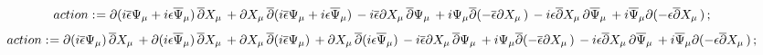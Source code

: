 \documentclass[11pt]{article}
\def\specialcolon{\mathrel{\mathop{:}}\hspace{-.5em}}
\renewcommand{\bar}[1]{\overline{#1}}
\begin{document}
\begin{dmath*}[compact, spread=2pt]
action\specialcolon{}= \partial{(i \bar{\epsilon} {\Psi}_{\mu} + i \epsilon {\bar{\Psi}}_{\mu})}\,  \bar{\partial}{{X}_{\mu}}\,  + \partial{{X}_{\mu}}\,  \bar{\partial}{(i \bar{\epsilon} {\Psi}_{\mu} + i \epsilon {\bar{\Psi}}_{\mu})}\,  - i \bar{\epsilon} \partial{{X}_{\mu}}\,  \bar{\partial}{{\Psi}_{\mu}}\,  + i {\Psi}_{\mu} \bar{\partial}{(-\bar{\epsilon} \partial{{X}_{\mu}}\, )}\,  - i \epsilon \bar{\partial}{{X}_{\mu}}\,  \partial{{\bar{\Psi}}_{\mu}}\,  + i {\bar{\Psi}}_{\mu} \partial{(-\epsilon \bar{\partial}{{X}_{\mu}}\, )}\, ;
\end{dmath*}
\begin{dmath*}[compact, spread=2pt]
action\specialcolon{}= \partial{(i \bar{\epsilon} {\Psi}_{\mu})}\,  \bar{\partial}{{X}_{\mu}}\,  + \partial{(i \epsilon {\bar{\Psi}}_{\mu})}\,  \bar{\partial}{{X}_{\mu}}\,  + \partial{{X}_{\mu}}\,  \bar{\partial}{(i \bar{\epsilon} {\Psi}_{\mu})}\,  + \partial{{X}_{\mu}}\,  \bar{\partial}{(i \epsilon {\bar{\Psi}}_{\mu})}\,  - i \bar{\epsilon} \partial{{X}_{\mu}}\,  \bar{\partial}{{\Psi}_{\mu}}\,  + i {\Psi}_{\mu} \bar{\partial}{(-\bar{\epsilon} \partial{{X}_{\mu}}\, )}\,  - i \epsilon \bar{\partial}{{X}_{\mu}}\,  \partial{{\bar{\Psi}}_{\mu}}\,  + i {\bar{\Psi}}_{\mu} \partial{(-\epsilon \bar{\partial}{{X}_{\mu}}\, )}\, ;
\end{dmath*}
\end{document}

